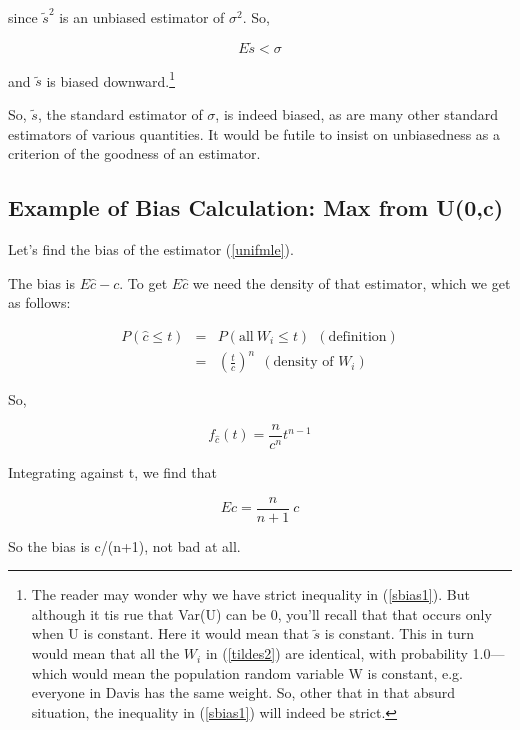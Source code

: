 since $\tilde{s}^2$ is an unbiased estimator of $\sigma^2$.  So,

\begin{equation}
E\tilde{s} < \sigma
\end{equation}

and $\tilde{s}$ is biased downward.\footnote{The reader may wonder why
we have strict inequality in (\ref{sbias1}).   But although it tis rue
that Var(U) can be 0, you'll recall that that occurs only when
U is constant.  Here it would mean that $\tilde{s}$ is constant.  This
in turn would mean that all the $W_i$ in (\ref{tildes2}) are identical,
with probability 1.0---which would mean the population random variable W
is constant, e.g. everyone in Davis has the same weight.  So, other that
in that absurd situation, the inequality in (\ref{sbias1}) will indeed
be strict.}

So, $\tilde{s}$, the standard estimator of $\sigma$, is indeed biased, as
are many other standard estimators of various quantities.  It would be
futile to insist on unbiasedness as a criterion of the goodness of an
estimator.

\subsection{Example of Bias Calculation:  Max from U(0,c)}

Let's find the bias of the estimator (\ref{unifmle}).

The bias is $E\widehat{c} - c$.  To get $E\widehat{c}$ we need the
density of that estimator, which we get as follows:

\begin{eqnarray}
P(\widehat{c} \leq t) &=& P(\textrm{all} ~ W_i \leq t)  ~~ (\textrm{definition})\\
&=& \left ( \frac{t}{c} \right )^n ~~ (\textrm{density of } W_i)
\end{eqnarray}

So,

\begin{equation}
f_{\widehat{c}}(t) = \frac{n}{c^n}  t^{n-1}
\end{equation}

Integrating against t, we find that

\begin{equation}
\label{notbad}
E\widehat{c} = \frac{n}{n+1} ~ c
\end{equation}

So the bias is c/(n+1), not bad at all.

